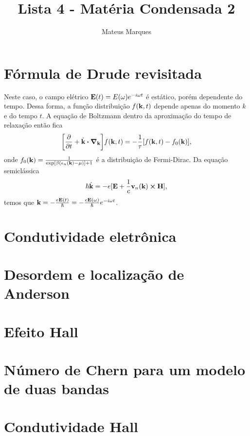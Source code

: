 \documentclass[a4paper,10pt]{article}
\title{\Huge{\textbf{Lista 4 - Matéria Condensada 2}}}
\author{Mateus Marques}
\begin{document}
\maketitle

\section{Fórmula de Drude revisitada}

Neste caso, o campo elétrico $\vb{E}(t) = E(\omega) e^{-i\omega t}$ é estático, porém dependente do tempo. Dessa forma, a função distribuição $f(\vb{k}, t)$ depende apenas do momento $k$ e do tempo $t$. A equação de Boltzmann dentro da aproximação do tempo de relaxação então fica
$$
\qty[\pdv{t} + \dot{\k} \vdot \grad_{\k}] f(\k, t) =
-\frac{1}{\tau} \qty[f(\k,t) - f_0(\k)],
$$
onde $f_0(\vb{k}) = \frac{1}{\exp[\beta(\epsilon_n(\vb{k})-\mu)] + 1}$ é a distribuição de Fermi-Dirac. Da equação semiclássica
$$
\hbar \dot{\k} = -e [\E + \frac{1}{c} \v_n(\k) \cp \vb{H}],
$$
temos que $\vb{k} = - \frac{e \vb{E}(t)}{\hbar} = -\frac{e \vb{E}(\omega)}{\hbar} e^{-i\omega t}$.

\pagebreak

\section{Condutividade eletrônica}

\pagebreak

\section{Desordem e localização de Anderson}

\pagebreak

\section{Efeito Hall}

\pagebreak

\section{Número de Chern para um modelo de duas bandas}

\pagebreak

\section{Condutividade Hall}


\pagebreak
\end{document}
